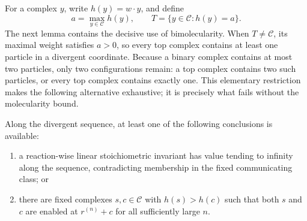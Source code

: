 For a complex \(y\), write \(h(y)=w\cdot y\), and define
\begin{equation}\label{eq:top}
  a=\max_{y\in\mathcal C}h(y),
  \qquad
  T=\{y\in\mathcal C:h(y)=a\}.
\end{equation}
The next lemma contains the decisive use of bimolecularity.
When \(T\ne\mathcal C\), its maximal weight satisfies \(a>0\), so every top
complex contains at least one particle in a divergent coordinate.  Because a
binary complex contains at most two particles, only two configurations remain:
a top complex contains two such particles, or every top complex contains
exactly one.  This elementary restriction makes the following alternative
exhaustive; it is precisely what fails without the molecularity bound.

\begin{lemma}\label{lem:top}
Along the divergent sequence, at least one of the following conclusions is
available:

\begin{enumerate}[label=\textup{(\roman*)},leftmargin=2.5em]
\item a reaction-wise linear stoichiometric invariant has value tending to
      infinity along the sequence, contradicting membership in the fixed
      communicating class; or
\item there are fixed complexes \(s,c\in\mathcal C\) with
      \(h(s)>h(c)\) such that both \(s\) and \(c\) are enabled at
      \(r^{(n)}+c\) for all sufficiently large \(n\).
\end{enumerate}
\end{lemma}

